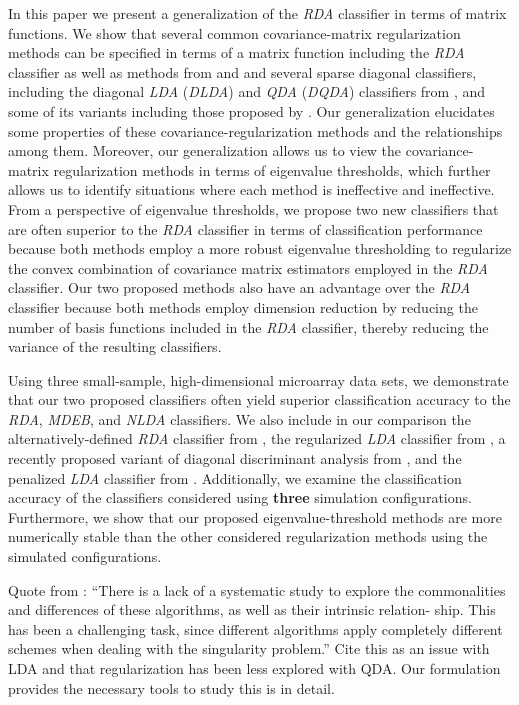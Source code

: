 \documentclass[11pt]{article}
\begin{document}
In this paper we present a generalization of the \emph{RDA} classifier in terms of matrix functions. We show that several common covariance-matrix regularization methods can be specified in terms of a matrix function including the \emph{RDA} classifier as well as methods from \cite{Srivastava:2007ww} and \cite*{Thomaz:2006ef} and several sparse diagonal classifiers, including the diagonal \emph{LDA} (\emph{DLDA}) and \emph{QDA} (\emph{DQDA}) classifiers from \cite{Dudoit:2002ev}, and some of its variants including those proposed by \cite{Pang:2009ik}.  Our generalization elucidates some properties of these covariance-regularization methods and the relationships among them. Moreover, our generalization allows us to view the covariance-matrix regularization methods in terms of eigenvalue thresholds, which further allows us to identify situations where each method is ineffective and ineffective. From a perspective of eigenvalue thresholds, we propose two new classifiers that are often superior to the \emph{RDA} classifier in terms of classification performance because both methods employ a more robust eigenvalue thresholding to regularize the convex combination of covariance matrix estimators employed in the \emph{RDA} classifier. Our two proposed methods also have an advantage over the \emph{RDA} classifier because both methods employ dimension reduction by reducing the number of basis functions included in the \emph{RDA} classifier, thereby reducing the variance of the resulting classifiers.

Using three small-sample, high-dimensional microarray data sets, we demonstrate that our two proposed classifiers often yield superior classification accuracy to the \emph{RDA}, \emph{MDEB}, and \emph{NLDA} classifiers. We also include in our comparison the alternatively-defined \emph{RDA} classifier from \cite*{Hastie:2008dt}, the regularized \emph{LDA} classifier from \cite{Guo:2007te}, a recently proposed variant of diagonal discriminant analysis from \cite*{Tong:2012hw}, and the penalized \emph{LDA} classifier from \cite{Witten:2011kc}. Additionally, we examine the classification accuracy of the classifiers considered using \textbf{three} simulation configurations. Furthermore, we show that our proposed eigenvalue-threshold methods are more numerically stable than the other considered regularization methods using the simulated configurations.

Quote from \cite{Ye:2009gd}: ``There is a lack of a systematic study to explore the commonalities and differences of these algorithms, as well as their intrinsic relation- ship. This has been a challenging task, since different algorithms apply completely different schemes when dealing with the singularity problem.'' Cite this as an issue with LDA and that regularization has been less explored with QDA. Our formulation provides the necessary tools to study this is in detail.
\end{document}
